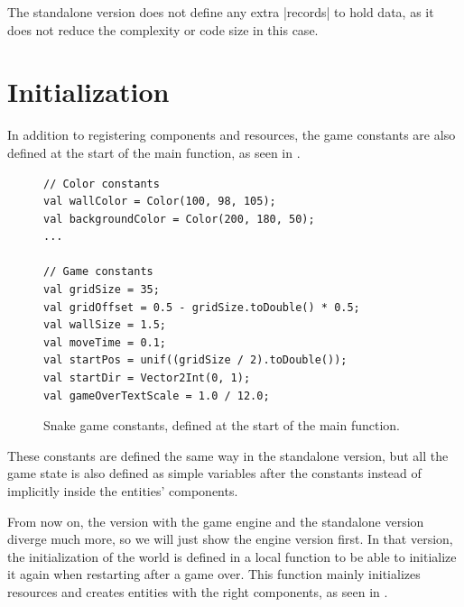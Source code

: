 The standalone version does not define any extra |records| to hold data, as it does not reduce the complexity or code size in this case.

\section{Initialization}

In addition to registering components and resources, the game constants are also defined at the start of the main function, as seen in .

\begin{figure}[h!]
\begin{lstlisting}
// Color constants
val wallColor = Color(100, 98, 105);
val backgroundColor = Color(200, 180, 50);
...

// Game constants
val gridSize = 35;
val gridOffset = 0.5 - gridSize.toDouble() * 0.5;
val wallSize = 1.5;
val moveTime = 0.1;
val startPos = unif((gridSize / 2).toDouble());
val startDir = Vector2Int(0, 1);
val gameOverTextScale = 1.0 / 12.0;
\end{lstlisting}
\caption{Snake game constants, defined at the start of the main function.}
\label{fig:caseconstants}
\end{figure}

These constants are defined the same way in the standalone version, but all the game state is also defined as simple variables after the constants instead of implicitly inside the entities' components.

From now on, the version with the game engine and the standalone version diverge much more, so we will just show the engine version first. In that version, the initialization of the world is defined in a local function to be able to initialize it again when restarting after a game over. This function mainly initializes resources and creates entities with the right components, as seen in .

